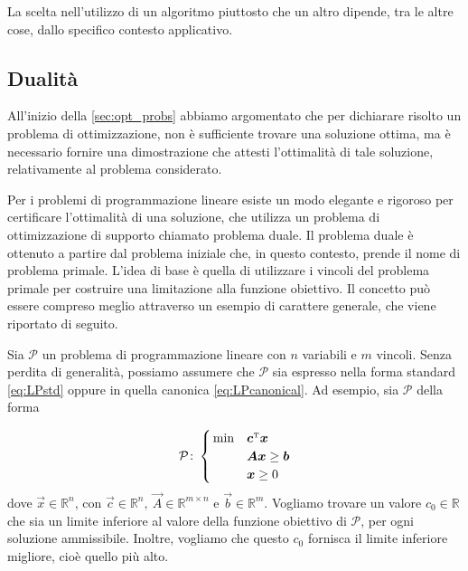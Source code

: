 La scelta nell'utilizzo di un algoritmo piuttosto che un altro dipende, tra
le altre cose, dallo specifico contesto applicativo.

\subsection{Dualità}
All'inizio della \cref{sec:opt_probs} abbiamo argomentato che per
dichiarare risolto un problema di ottimizzazione, non è sufficiente trovare
una soluzione ottima, ma è necessario fornire una dimostrazione
che attesti l'ottimalità di tale soluzione, relativamente al problema
considerato.

Per i problemi di programmazione lineare esiste un modo elegante e rigoroso
per certificare l'ottimalità di una soluzione, che utilizza un problema di
ottimizzazione di supporto chiamato problema duale. Il problema duale è
ottenuto a partire dal problema iniziale che, in questo contesto, prende il
nome di problema primale. L'idea di base è quella di utilizzare i vincoli
del problema primale per costruire una limitazione alla funzione obiettivo.
Il concetto può essere compreso meglio attraverso un esempio di carattere
generale, che viene riportato di seguito.

Sia $\mathcal{P}$ un problema di programmazione lineare con $n$ variabili e
$m$ vincoli. Senza perdita di generalità, possiamo assumere che
$\mathcal{P}$ sia espresso nella forma standard \eqref{eq:LPstd} oppure in
quella canonica \eqref{eq:LPcanonical}. Ad esempio, sia $\mathcal{P}$ della
forma

\begin{equation}
    \mathcal{P}\colon
    \begin{cases}
        \,\min & \bm{c}^{\scriptscriptstyle\mathrm{T}} \bm{x} \\
               & \bm{A} \bm{x} \ge \bm{b} \\
             & \bm{x} \ge 0
    \end{cases}\\[5pt]
\end{equation}
dove $\vec{x} \in \mathbb{R}^n$, con $\vec{c} \in \mathbb{R}^n,\ \vec{A}
\in \mathbb{R}^{m \times n}$ e $\vec{b} \in \mathbb{R}^m$. Vogliamo trovare
un valore $c_{0} \in \mathbb{R}$ che sia un limite inferiore al valore
della funzione obiettivo di $\mathcal{P}$, per ogni soluzione ammissibile.
Inoltre, vogliamo che questo $c_{0}$ fornisca il limite inferiore migliore,
cioè quello più alto.

